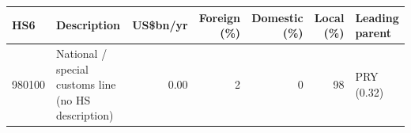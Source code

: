 \begin{tabular}{@{}l p{6.4cm} r r r r l@{}}
\toprule
HS6 & Description & US\$bn/yr & Foreign (\%) & Domestic (\%) & Local (\%) & Leading parent \\
\midrule
980100 & National /\allowbreak{} special customs line (no HS description) & 0.00 & 2 & 0 & 98 & PRY (0.32) \\
\bottomrule
\end{tabular}
